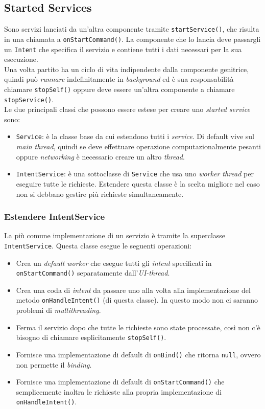 \subsection{Started Services}
Sono servizi lanciati da un'altra componente tramite \texttt{startService()}, che risulta in una chiamata a \texttt{onStartCommand()}. La componente che lo lancia deve passargli un \texttt{Intent} che specifica il servizio e contiene tutti i dati necessari per la sua esecuzione.\\
Una volta partito ha un ciclo di vita indipendente dalla componente genitrice, quindi può \textit{runnare} indefinitamente in \textit{background} ed è sua responsabilità chiamare \texttt{stopSelf()} oppure deve essere un'altra componente a chiamare \texttt{stopService()}.\\
Le due principali classi che possono essere estese per creare uno \textit{started service} sono:
\begin{itemize}
	\item \texttt{Service}: è la classe base da cui estendono tutti i \textit{service}. Di default vive sul \textit{main thread}, quindi se deve effettuare operazione computazionalmente pesanti oppure \textit{networking} è necessario creare un altro \textit{thread}.
	\item \texttt{IntentService}: è una sottoclasse di \texttt{Service} che usa uno \textit{worker thread} per eseguire tutte le richieste. Estendere questa classe è la scelta migliore nel caso non si debbano gestire più richieste simultaneamente.
\end{itemize}

\subsubsection{Estendere IntentService}
La più comune implementazione di un servizio è tramite la superclasse \texttt{IntentService}.
Questa classe esegue le seguenti operazioni:
\begin{itemize}
	\item Crea un \textit{default worker} che esegue tutti gli \textit{intent} specificati in \texttt{onStartCommand()} separatamente dall'\textit{UI-thread}.
	\item Crea una coda di \textit{intent} da passare uno alla volta alla implementazione del metodo \texttt{onHandleIntent()} (di questa classe). In questo modo non ci saranno problemi di \textit{multithreading}.
	\item Ferma il servizio dopo che tutte le richieste sono state processate, così non c'è bisogno di chiamare esplicitamente \texttt{stopSelf()}.
	\item Fornisce una implementazione di default di \texttt{onBind()} che ritorna \texttt{null}, ovvero non permette il \textit{binding}.
	\item Fornisce una implementazione di default di \texttt{onStartCommand()} che semplicemente inoltra le richieste alla propria implementazione di \texttt{onHandleIntent()}.
\end{itemize}

